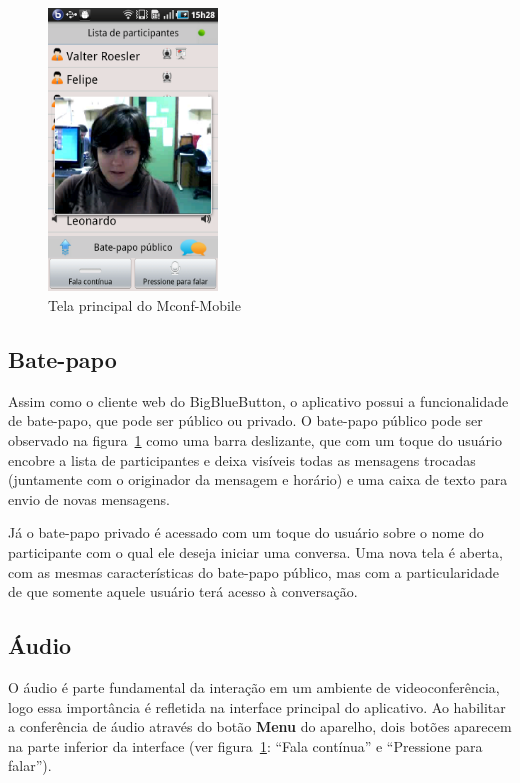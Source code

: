 \documentclass{acm_proc_article-sp}
\begin{document}
\begin{figure}[htp]
\centering
\includegraphics[width=45mm]{app1.png}
\caption{Tela principal do Mconf-Mobile}\label{fig:mconf-mobile}
\end{figure}

\subsection{Bate-papo}

Assim como o cliente web do BigBlueButton, o aplicativo possui a funcionalidade de bate-papo, que pode ser público ou privado. O bate-papo público pode ser observado na figura~\ref{fig:mconf-mobile} como uma barra deslizante, que com um toque do usuário encobre a lista de participantes e deixa visíveis todas as mensagens trocadas (juntamente com o originador da mensagem e horário) e uma caixa de texto para envio de novas mensagens.

Já o bate-papo privado é acessado com um toque do usuário sobre o nome do participante com o qual ele deseja iniciar uma conversa. Uma nova tela é aberta, com as mesmas características do bate-papo público, mas com a particularidade de que somente aquele usuário terá acesso à conversação.

\subsection{Áudio}

O áudio é parte fundamental da interação em um ambiente de videoconferência, logo essa importância é refletida na interface principal do aplicativo. Ao habilitar a conferência de áudio através do botão \textbf{Menu} do aparelho, dois botões aparecem na parte inferior da interface (ver figura~\ref{fig:mconf-mobile}: ``Fala contínua'' e ``Pressione para falar'').
\end{document}
